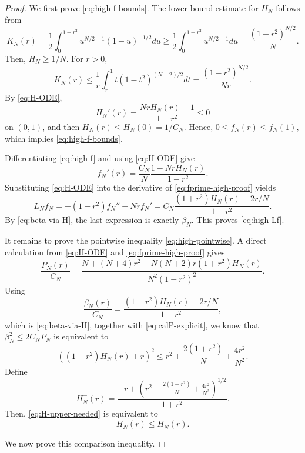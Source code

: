 \documentclass[10pt,a4paper]{amsart}
\begin{document}
\begin{proof}
We first prove \eqref{eq:high-f-bounds}. The lower bound estimate for $H_N$ follows from 
\[K_N(r)=\frac{1}{2} \int_0^{1-r^2} u^{N / 2-1}(1-u)^{-1 / 2} d u \geq \frac{1}{2} \int_0^{1-r^2} u^{N / 2-1} d u=\frac{\left(1-r^2\right)^{N / 2}}{N}.\]
Then, $H_N \ge 1/N$. For $r>0$,
\[
K_N(r) \leq \frac{1}{r} \int_r^1 t\left(1-t^2\right)^{(N-2) / 2} d t=\frac{\left(1-r^2\right)^{N / 2}}{N r}.
\]
By \eqref{eq:H-ODE},
\[
 H_N'(r)=\frac{NrH_N(r)-1}{1-r^2}\le0
\]
on $(0,1)$, and then $H_N(r)\le H_N(0)=1/C_N$.  Hence, $ 0\le f_N(r)\le f_N(1),$ which implies \eqref{eq:high-f-bounds}.

Differentiating \eqref{eq:high-f} and using \eqref{eq:H-ODE} give
\begin{equation}\label{eq:fprime-high-proof}
 f_N'(r)=\frac{C_N}{N}\frac{1-NrH_N(r)}{1-r^2}.
\end{equation}
Substituting \eqref{eq:H-ODE} into the derivative of \eqref{eq:fprime-high-proof} yields
\[
 L_Nf_N=-(1-r^2)f_N''+Nrf_N'
 =C_N\frac{(1+r^2)H_N(r)-2r/N}{1-r^2}.
\]
By \eqref{eq:beta-via-H}, the last expression is exactly $\beta_N$. This proves \eqref{eq:high-Lf}.

It remains to prove the pointwise inequality \eqref{eq:high-pointwise}.  A direct calculation from \eqref{eq:H-ODE} and \eqref{eq:fprime-high-proof} gives 
\begin{equation}\label{eq:calP-explicit}
 \frac{P_N(r)}{C_N}
 =\frac{N+(N+4)r^2-N(N+2)r(1+r^2)H_N(r)}{N^2(1-r^2)^2}.
\end{equation}
Using 
\[
\frac{\beta_N(r)}{C_N}=\frac{\left(1+r^2\right) H_N(r)-2 r / N}{1-r^2},
\]
which is \eqref{eq:beta-via-H}, together with \eqref{eq:calP-explicit}, we know that
$\beta_N^2\le2C_NP_N$ is equivalent to
\begin{equation}\label{eq:H-upper-needed}
 \left((1+r^2)H_N(r)+r\right)^2
 \le
 r^2+\frac{2(1+r^2)}{N}+\frac{4r^2}{N^2}.
\end{equation}
Define
\begin{equation}\label{eq:Hplus}
 H_N^+(r)=
 \frac{-r+\left(r^2+\frac{2(1+r^2)}{N}+\frac{4r^2}{N^2}\right)^{1/2}}
 {1+r^2}.
\end{equation}
Then, \eqref{eq:H-upper-needed} is equivalent to
\begin{equation}\label{eq:HleHplus}
 H_N(r)\le H_N^+(r).
\end{equation}

We now prove this comparison inequality.


\end{proof}
\end{document}
